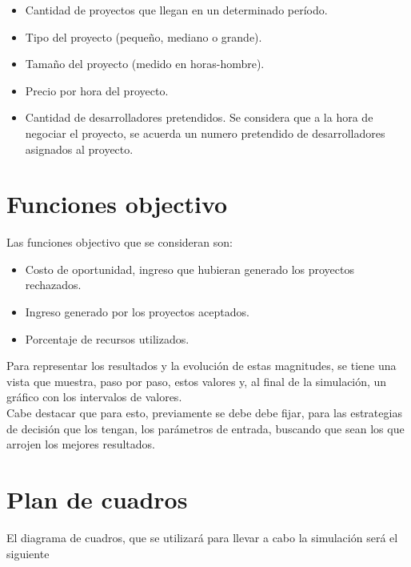 \begin{itemize}
    \item Cantidad de proyectos que llegan en un determinado período.
    \item Tipo del proyecto (pequeño, mediano o grande).
    \item Tamaño del proyecto (medido en horas-hombre).
    \item Precio por hora del proyecto.
    \item Cantidad de desarrolladores pretendidos. Se considera que a la hora de negociar el proyecto, se acuerda un numero pretendido de desarrolladores asignados al proyecto.
\end{itemize}

\section{Funciones objectivo}
Las funciones objectivo que se consideran son:

\begin{itemize}
    \item Costo de oportunidad, ingreso que hubieran generado los proyectos rechazados.
    \item Ingreso generado por los proyectos aceptados.
    \item Porcentaje de recursos utilizados.
\end{itemize}

Para representar los resultados y la evolución de estas magnitudes, se tiene una vista que muestra, paso por paso, estos valores y, al final de la simulación, un
gráfico con los intervalos de valores. \\

Cabe destacar que para esto, previamente se debe debe fijar, para las estrategias de decisión que los tengan, los parámetros de entrada, buscando que sean los
que arrojen los mejores resultados.\\

\section{Plan de cuadros}

El diagrama de cuadros, que se utilizará para llevar a cabo la simulación será el siguiente

